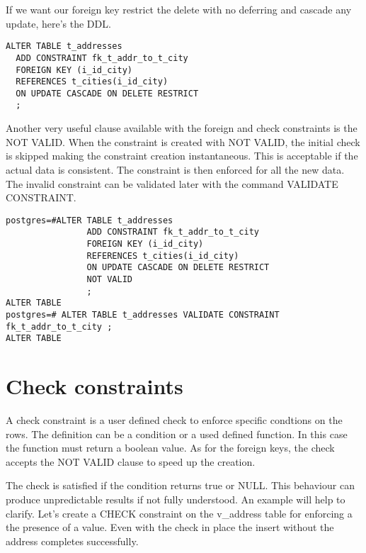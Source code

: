 If we want our foreign key restrict the delete with no deferring and cascade any update, here's the 
DDL.

\begin{lstlisting}[style=pgsql]
ALTER TABLE t_addresses 
  ADD CONSTRAINT fk_t_addr_to_t_city
  FOREIGN KEY (i_id_city)
  REFERENCES t_cities(i_id_city)
  ON UPDATE CASCADE ON DELETE RESTRICT
  ;

\end{lstlisting}

Another very useful clause available with the foreign and check constraints is the NOT VALID. When 
the constraint is created with NOT VALID, the initial check is skipped making the constraint 
creation instantaneous. This is acceptable if the actual data is consistent. The constraint is then 
enforced for all the new data. The invalid constraint can be validated later with the command 
VALIDATE CONSTRAINT.

\begin{lstlisting}[style=pgsql]
postgres=#ALTER TABLE t_addresses
                ADD CONSTRAINT fk_t_addr_to_t_city
                FOREIGN KEY (i_id_city)
                REFERENCES t_cities(i_id_city)
                ON UPDATE CASCADE ON DELETE RESTRICT
                NOT VALID
                ;
ALTER TABLE
postgres=# ALTER TABLE t_addresses VALIDATE CONSTRAINT fk_t_addr_to_t_city ;
ALTER TABLE

\end{lstlisting}



\section{Check constraints}
\label{sec:CHECKCNS}

A check constraint is a user defined check to enforce specific condtions on the rows. 
The definition can be a condition or a used defined function. In this case the function must return 
a boolean value.  As for the foreign keys, the check accepts the NOT VALID clause to speed up the 
creation.\newline

The check is satisfied if the condition returns true or NULL. This behaviour can 
produce unpredictable results if not fully understood. An example will help to clarify. 
Let's create a CHECK constraint on the v\_address table for enforcing a the presence of a value.
Even with the check in place the insert without the address completes successfully.

